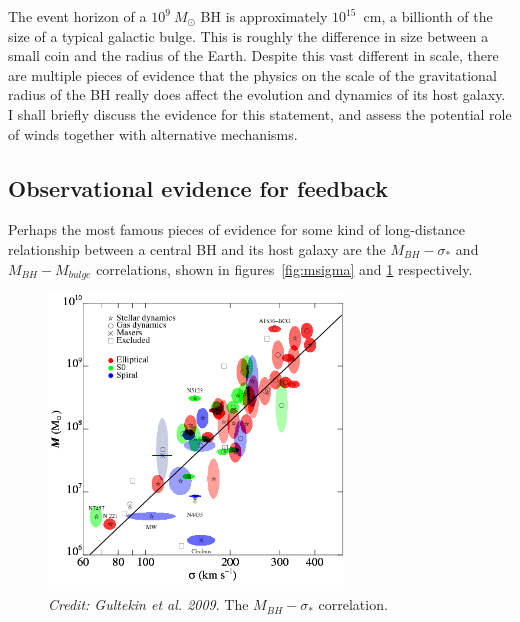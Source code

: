 The event horizon of a $10^9~M_\odot$ BH is approximately 
$10^{15}$~cm, a billionth of the size of a typical galactic bulge. This is 
roughly the difference in size between a small coin and the radius of the 
Earth. Despite this vast different in scale, there are multiple
pieces of evidence that the physics on the scale of the gravitational
radius of the BH really does affect the evolution and dynamics of its host galaxy.
I shall briefly discuss the evidence for this statement, and 
assess the potential role of winds together with alternative mechanisms.

\subsection{Observational evidence for feedback}

Perhaps the most famous pieces of evidence for some kind of long-distance 
relationship between a central BH and its host galaxy are the 
$M_{BH}-\sigma_*$ and $M_{BH}-M_{bulge}$ correlations, shown in figures~\ref{fig:msigma}
and \ref{fig:mbulge} respectively.

\nocite{mcconnell2013,gultekin2009}
\begin{figure}
\centering
\includegraphics[width=0.7\textwidth]{figures/02-outflows/msigma.png}
\caption
{
{\sl Credit: Gultekin et al. 2009}. 
The $M_{BH}-\sigma_*$ correlation.
} 
\label{fig:mbulge}
\end{figure}

